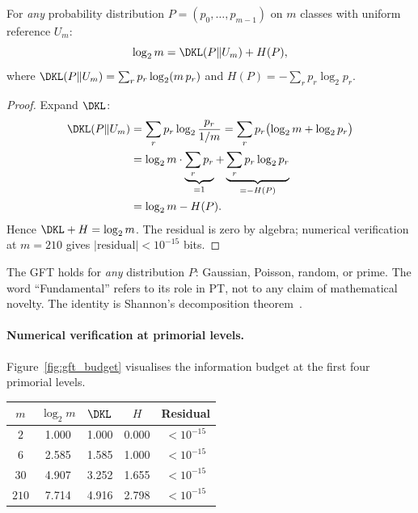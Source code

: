 \documentclass[12pt,a4paper]{article}
\begin{document}
\mID
\begin{idbox}
\label{id:gft}
For \emph{any} probability distribution $P = (p_0, \ldots, p_{m-1})$
on $m$ classes with uniform reference $U_m$:
\begin{equation}
  \log_2 m = \DKL(P \| U_m) + H(P),
  \label{eq:gft}
\end{equation}
where $\DKL(P\|U_m) = \sum_r p_r \log_2(m\, p_r)$ and
$H(P) = -\sum_r p_r \log_2 p_r$.

\begin{proof}
Expand $\DKL$:
\begin{align*}
  \DKL(P\|U_m)
  &= \sum_r p_r \log_2\frac{p_r}{1/m}
   = \sum_r p_r \bigl(\log_2 m + \log_2 p_r\bigr) \\
  &= \log_2 m \cdot \underbrace{\sum_r p_r}_{=1}
   + \underbrace{\sum_r p_r \log_2 p_r}_{=-H(P)} \\
  &= \log_2 m - H(P).
\end{align*}
Hence $\DKL + H = \log_2 m$. The residual is zero by algebra; numerical
verification at $m = 210$ gives $|\text{residual}| < 10^{-15}$ bits.
\end{proof}
\end{idbox}

\begin{remark}[Universality]
The GFT holds for \emph{any} distribution $P$: Gaussian, Poisson,
random, or prime. The word ``Fundamental'' refers to its role in PT,
not to any claim of mathematical novelty. The identity is Shannon's
decomposition theorem~\cite{Shannon1948}.
\end{remark}

\paragraph{Numerical verification at primorial levels.}
Figure~\ref{fig:gft_budget} visualises the information budget at the
first four primorial levels.

\begin{center}
\begin{tabular}{ccccc}
\toprule
$m$ & $\log_2 m$ & $\DKL$ & $H$ & Residual \\
\midrule
$2$   & 1.000 & 1.000 & 0.000 & $< 10^{-15}$ \\
$6$   & 2.585 & 1.585 & 1.000 & $< 10^{-15}$ \\
$30$  & 4.907 & 3.252 & 1.655 & $< 10^{-15}$ \\
$210$ & 7.714 & 4.916 & 2.798 & $< 10^{-15}$ \\
\bottomrule
\end{tabular}
\end{center}
\end{document}
